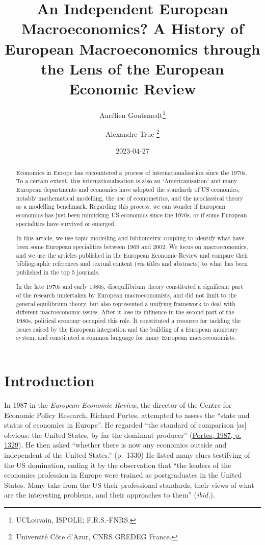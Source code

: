 \documentclass[
  12pt,
  onecolumn]{article}
\title{An Independent European Macroeconomics? A History of European
Macroeconomics through the Lens of the European Economic Review}
\author{Aurélien Goutsmedt\footnote{UCLouvain, ISPOLE; F.R.S.-FNRS.} \and Alexandre
Truc \footnote{Université Côte d'Azur, CNRS GREDEG France.}}
\date{2023-04-27}
\begin{document}
\maketitle
\begin{abstract}
Economics in Europe has encountered a process of internationalisation
since the 1970s. To a certain extent, this internationalisation is also
an `Americanisation' and many European departments and economics have
adopted the standards of US economics, notably mathematical modelling,
the use of econometrics, and the neoclassical theory as a modelling
benchmark. Regarding this process, we can wonder if European economics
has just been mimicking US economics since the 1970s, or if some
European specialities have survived or emerged.

In this article, we use topic modelling and bibliometric coupling to
identify what have been some European specialities between 1969 and
2002. We focus on macroeconomics, and we use the articles published in
the European Economic Review and compare their bibliographic references
and textual content (\emph{via} titles and abstracts) to what has been
published in the top 5 journals.

In the late 1970s and early 1980s, disequilibrium theory constituted a
significant part of the research undertaken by European macroeconomists,
and did not limit to the general equilibrium theory, but also
represented a unifying framework to deal with different macroeconomic
issues. After it lose its influence in the second part of the 1980s,
political economy occupied this role. It constituted a resource for
tackling the issues raised by the European integration and the building
of a European monetary system, and constituted a common language for
many European macroeconomists.
\end{abstract}

\hypertarget{introduction}{%
\section{Introduction}\label{introduction}}

In 1987 in the \emph{European Economic Review}, the director of the
Centre for Economic Policy Research, Richard Portes, attempted to assess
the ``state and status of economics in Europe''. He regarded ``the
standard of comparison {[}as{]} obvious: the United States, by far the
dominant producer'' (\protect\hyperlink{ref-portes1987}{Portes, 1987, p.
1329}). He then asked ``whether there is now any economics outside and
independent of the United States.'' (p.~1330) He listed many clues
testifying of the US domination, ending it by the observation that ``the
leaders of the economics profession in Europe were trained as
postgraduates in the United States. Many take from the US their
professional standards, their views of what are the interesting
problems, and their approaches to them'' (\emph{ibid.}).
\end{document}
